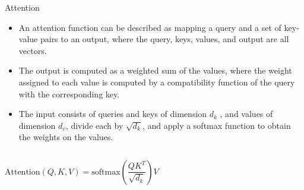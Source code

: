 \documentclass{beamer}
\begin{document}
\begin{frame}{Attention}
    \begin{itemize}
        \item An attention function can be described as mapping a query and a set of key-value pairs to an output, where the query, keys, values, and output are all vectors. 
        \item The output is computed as a weighted sum of the values, where the weight assigned to each value is computed by a compatibility function of the query with the corresponding key.
        \item The input consists of queries and keys of dimension $d_k$ , and values of dimension $d_v$, divide each by $\sqrt{d_k}$, and apply a softmax function to obtain the weights on the values.
    \end{itemize}
    
    \vspace{0.5em}
    \begin{columns}
        \[
        \text{Attention}(Q, K, V) = \text{softmax}\left(\frac{QK^T}{\sqrt{d_k}}\right)V
        \]


\end{columns}
\end{frame}
\end{document}
